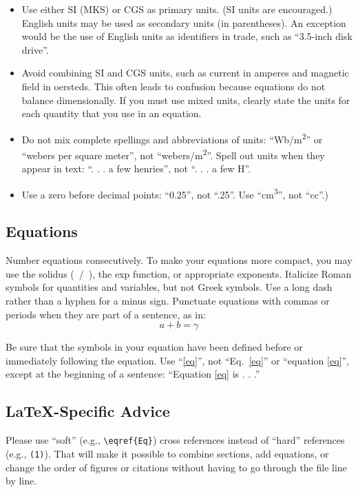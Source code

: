 \documentclass[a4paper,conference]{IEEEtran}
\begin{document}
\begin{itemize}
\item Use either SI (MKS) or CGS as primary units. (SI units are encouraged.) English units may be used as secondary units (in parentheses). An exception would be the use of English units as identifiers in trade, such as ``3.5-inch disk drive''.
\item Avoid combining SI and CGS units, such as current in amperes and magnetic field in oersteds. This often leads to confusion because equations do not balance dimensionally. If you must use mixed units, clearly state the units for each quantity that you use in an equation.
\item Do not mix complete spellings and abbreviations of units: ``Wb/m\textsuperscript{2}'' or ``webers per square meter'', not ``webers/m\textsuperscript{2}''. Spell out units when they appear in text: ``. . . a few henries'', not ``. . . a few H''.
\item Use a zero before decimal points: ``0.25'', not ``.25''. Use ``cm\textsuperscript{3}'', not ``cc''.)
\end{itemize}

\subsection{Equations}
Number equations consecutively. To make your 
equations more compact, you may use the solidus (~/~), the exp function, or 
appropriate exponents. Italicize Roman symbols for quantities and variables, 
but not Greek symbols. Use a long dash rather than a hyphen for a minus 
sign. Punctuate equations with commas or periods when they are part of a 
sentence, as in:
\begin{equation}
a+b=\gamma\label{eq}
\end{equation}

Be sure that the 
symbols in your equation have been defined before or immediately following 
the equation. Use ``\eqref{eq}'', not ``Eq.~\eqref{eq}'' or ``equation \eqref{eq}'', except at 
the beginning of a sentence: ``Equation \eqref{eq} is . . .''

\subsection{\LaTeX-Specific Advice}

Please use ``soft'' (e.g., \verb|\eqref{Eq}|) cross references instead
of ``hard'' references (e.g., \verb|(1)|). That will make it possible
to combine sections, add equations, or change the order of figures or
citations without having to go through the file line by line.
\end{document}
